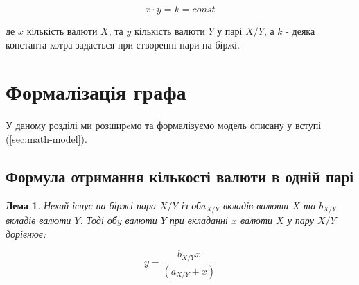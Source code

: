 \documentclass[a4paper, 11pt]{article}
\newcommand{\tqs}{\textquotesingle}
\newtheorem{lemma}{Лема}
\begin{document}
\begin{equation}\label{eq:intro-swap}
x \cdot y = k = const
\end{equation}

де \(x\) кількість валюти \(X\), та \(y\) кількість валюти \(Y\) у парі \(X/Y\),
а \(k\) - деяка константа котра задається при створенні пари на біржі.

\newpage

\section{Формалізація графа}

У даному розділі ми розширeмо та формалізуємо модель описану у вступі
(\ref{sec:math-model}).

\subsection{Формула отримання кількості валюти в одній парі}

\begin{lemma} Нехай існує на біржі пара \(X/Y\) із об \(a_{X/Y}\) вкладів
валюти \(X\) та \(b_{X/Y}\) вкладів валюти \(Y\). Тоді об \(y\) валюти \(Y\)
при вкладанні \(x\) валюти \(X\) у пару \(X/Y\) дорівнює:

\begin{equation}\label{eq:swap}
y = \frac{b_{X/Y}x}{(a_{X/Y} + x)}
\end{equation}
\end{lemma}
\end{document}
